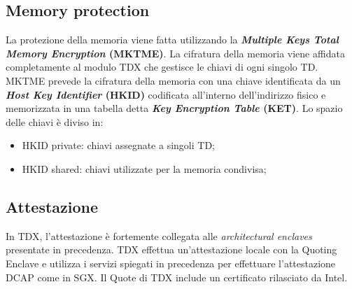 \documentclass{article}
\begin{document}
\subsection{Memory protection}
La protezione della memoria viene fatta utilizzando la \textbf{\textit{Multiple Keys Total Memory Encryption} (MKTME)}. La cifratura della memoria viene affidata completamente al modulo TDX che gestisce le chiavi di ogni singolo TD. MKTME prevede la cifratura della memoria con una chiave identificata da un \textbf{\textit{Host Key Identifier} (HKID)} codificata all'interno dell'indirizzo fisico e memorizzata in una tabella detta \textbf{\textit{Key Encryption Table} (KET)}. Lo spazio delle chiavi è diviso in:
\begin{itemize}
  \item HKID private: chiavi assegnate a singoli TD;
  \item HKID shared: chiavi utilizzate per la memoria condivisa;
\end{itemize}
\subsection{Attestazione}
In TDX, l'attestazione è fortemente collegata alle \textit{architectural enclaves} presentate in precedenza. TDX effettua un'attestazione locale con la Quoting Enclave e utilizza i servizi spiegati in precedenza per effettuare l'attestazione DCAP come in SGX. Il Quote di TDX include un certificato rilasciato da Intel.

\clearpage
\pagestyle{plain}
\setcounter{page}{1}


\end{document}
